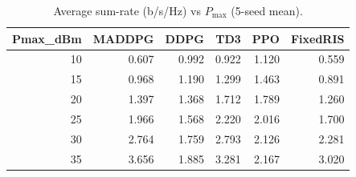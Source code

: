 \begin{table}[t]
\centering
\caption{Average sum-rate (b/s/Hz) vs $P_{\max}$ (5-seed mean).}
\label{tab:sumrate_vs_power}
\begin{tabular}{rrrrrr}
\toprule
Pmax\_dBm & MADDPG & DDPG & TD3 & PPO & FixedRIS \\
\midrule
10 & 0.607 & 0.992 & 0.922 & 1.120 & 0.559 \\
15 & 0.968 & 1.190 & 1.299 & 1.463 & 0.891 \\
20 & 1.397 & 1.368 & 1.712 & 1.789 & 1.260 \\
25 & 1.966 & 1.568 & 2.220 & 2.016 & 1.700 \\
30 & 2.764 & 1.759 & 2.793 & 2.126 & 2.281 \\
35 & 3.656 & 1.885 & 3.281 & 2.167 & 3.020 \\
\bottomrule
\end{tabular}

\end{table}
